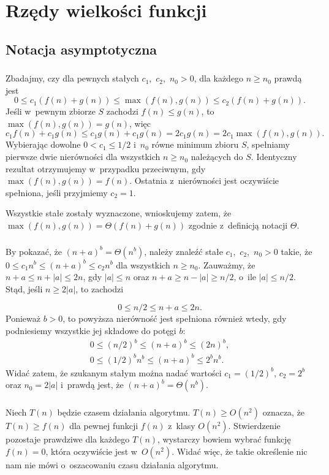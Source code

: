 \chapter{Rzędy wielkości funkcji}

\section{Notacja asymptotyczna}

\subsection{} %
Zbadajmy, czy dla pewnych stałych $c_1$,~$c_2$,~$n_0>0$, dla każdego $n\ge n_0$ prawdą jest
\[
	0 \le c_1(f(n)+g(n)) \le \max(f(n),g(n)) \le c_2(f(n)+g(n)).
\]
Jeśli w~pewnym zbiorze $S$ zachodzi $f(n)\le g(n)$, to $\max(f(n),g(n))=g(n)$, więc
\[
	c_1f(n)+c_1g(n) \le c_1g(n)+c_1g(n) = 2c_1g(n) = 2c_1\max(f(n), g(n)).
\]
Wybierając dowolne $0<c_1\le1/2$ i~$n_0$ równe minimum zbioru $S$, spełniamy pierwsze dwie nierówności dla wszystkich $n\ge n_0$ należących do $S$. Identyczny rezultat otrzymujemy w~przypadku przeciwnym, gdy $\max(f(n),g(n))=f(n)$. Ostatnia z~nierówności jest oczywiście spełniona, jeśli przyjmiemy $c_2=1$.

Wszystkie stałe zostały wyznaczone, wnioskujemy zatem, że $\max(f(n),g(n))=\Theta(f(n)+g(n))$ zgodnie z~definicją notacji $\Theta$.

\subsection{} %
By pokazać, że $(n+a)^b=\Theta(n^b)$, należy znaleźć stałe $c_1$,~$c_2$,~$n_0>0$ takie, że $0\le c_1n^b\le(n+a)^b\le c_2n^b$ dla wszystkich $n\ge n_0$. Zauważmy, że $n+a\le n+|a|\le2n$, gdy $|a|\le n$ oraz $n+a\ge n-|a|\ge n/2$, o~ile $|a|\le n/2$. Stąd, jeśli $n\ge 2|a|$, to zachodzi

\[
	0 \le n/2 \le n+a \le 2n.
\]
Ponieważ $b>0$, to powyższa nierówność jest spełniona również wtedy, gdy podniesiemy wszystkie jej składowe do potęgi $b$:
\begin{gather*}
	0 \le (n/2)^b \le (n+a)^b \le (2n)^b, \\
	0 \le (1/2)^bn^b \le (n+a)^b \le 2^bn^b.
\end{gather*}
Widać zatem, że szukanym stałym można nadać wartości $c_1=(1/2)^b$, $c_2=2^b$ oraz $n_0=2|a|$ i~prawdą jest, że $(n+a)^b=\Theta(n^b)$.

\subsection{} %
Niech $T(n)$ będzie czasem działania algorytmu. $T(n)\ge O(n^2)$ oznacza, że $T(n)\ge f(n)$ dla pewnej funkcji $f(n)$ z~klasy $O(n^2)$. Stwierdzenie pozostaje prawdziwe dla każdego $T(n)$, wystarczy bowiem wybrać funkcję $f(n)=0$, która oczywiście jest w~$O(n^2)$. Widać więc, że takie określenie nic nam nie mówi o~oszacowaniu czasu działania algorytmu.

